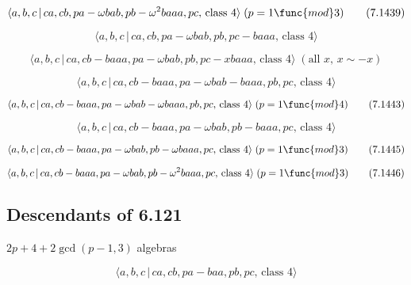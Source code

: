 \documentclass[10pt]{article}
\begin{document}
\begin{equation}
\langle a,b,c\,|\,ca,cb,pa-\omega bab,pb-\omega ^{2}baaa,pc,\,\text{class }%
4\rangle \;(p=1\func{mod}3)  \tag{7.1439}
\end{equation}

\begin{equation}
\langle a,b,c\,|\,ca,cb,pa-\omega bab,pb,pc-baaa,\,\text{class }4\rangle 
\tag{7.1440}
\end{equation}

\begin{equation}
\langle a,b,c\,|\,ca,cb-baaa,pa-\omega bab,pb,pc-xbaaa,\,\text{class }%
4\rangle \;(\text{all }x,\,x\sim -x)  \tag{7.1441}
\end{equation}

\begin{equation}
\langle a,b,c\,|\,ca,cb-baaa,pa-\omega bab-baaa,pb,pc,\,\text{class }4\rangle
\tag{7.1442}
\end{equation}

\begin{equation}
\langle a,b,c\,|\,ca,cb-baaa,pa-\omega bab-\omega baaa,pb,pc,\,\text{class }%
4\rangle \;(p=1\func{mod}4)  \tag{7.1443}
\end{equation}

\begin{equation}
\langle a,b,c\,|\,ca,cb-baaa,pa-\omega bab,pb-baaa,pc,\,\text{class }4\rangle
\tag{7.1444}
\end{equation}

\begin{equation}
\langle a,b,c\,|\,ca,cb-baaa,pa-\omega bab,pb-\omega baaa,pc,\,\text{class }%
4\rangle \;(p=1\func{mod}3)  \tag{7.1445}
\end{equation}

\begin{equation}
\langle a,b,c\,|\,ca,cb-baaa,pa-\omega bab,pb-\omega ^{2}baaa,pc,\,\text{%
class }4\rangle \;(p=1\func{mod}3)  \tag{7.1446}
\end{equation}

\subsection{Descendants of 6.121}

$2p+4+2\gcd (p-1,3)$ algebras

\begin{equation}
\langle a,b,c\,|\,ca,cb,pa-baa,pb,pc,\,\text{class }4\rangle  \tag{7.1447}
\end{equation}
\end{document}
